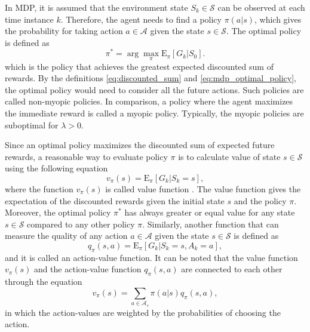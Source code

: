 \documentclass[english, 12pt, a4paper, elec, utf8, a-1b, online]{aaltothesis}
\newcommand{\Epolicy}[1]{\mathrm{E}_\pi \left[ #1 \right]}
\newcommand{\Ss}{\mathcal{S}}
\newcommand{\As}{\mathcal{A}}
\begin{document}
In MDP, it is assumed that the environment state $S_k \in \Ss$ can be observed at each time instance $k$.
Therefore, the agent needs to find a policy $\pi(a | s)$, which gives the probability for taking action $a \in \As$ given the state $s \in \Ss$.
The optimal policy is defined as
\begin{equation}\label{eq:mdp_optimal_policy}
    \pi^* = \arg\max_\pi\Epolicy{G_k | S_0}.
\end{equation}
which is the policy that achieves the greatest expected discounted sum of rewards.
By the definitions \eqref{eq:discounted_sum} and \eqref{eq:mdp_optimal_policy}, the optimal policy would need to consider all the future actions.
Such policies are called non-myopic policies.
In comparison, a policy where the agent maximizes the immediate reward is called a myopic policy. 
Typically, the myopic policies are suboptimal for $\lambda>0$.

Since an optimal policy maximizes the discounted sum of expected future rewards, a reasonable way to evaluate policy $\pi$ is to calculate value of state $s \in \Ss$ using the following equation
\begin{equation} \label{eq:value}
    v_\pi(s) = \Epolicy{G_k | S_k=s},
\end{equation}
where the function $v_\pi(s)$ is called value function \cite{Sutton2018}.
The value function gives the expectation of the discounted rewards given the initial state $s$ and the policy $\pi$.
Moreover, the optimal policy $\pi^*$ has always greater or equal value for any state $s \in \Ss$ compared to any other policy $\pi$.
Similarly, another function that can measure the quality of any action $a \in \As$ given the state $s \in \Ss$ is defined as
\begin{equation}\label{eq:action_value}
    q_\pi(s, a) = \Epolicy{G_k | S_k=s, A_k=a},
\end{equation}
and it is called an action-value function.
It can be noted that the value function $v_\pi(s)$ and the action-value function $ q_\pi(s, a)$ are connected to each other through the equation  
\begin{equation}\label{eq:value_action_value}
 v_\pi(s) =  \sum_{a\in \As_s} \pi(a | s) q_\pi(s, a),
\end{equation}
in which the action-values are weighted by the probabilities of choosing the action.
\end{document}
